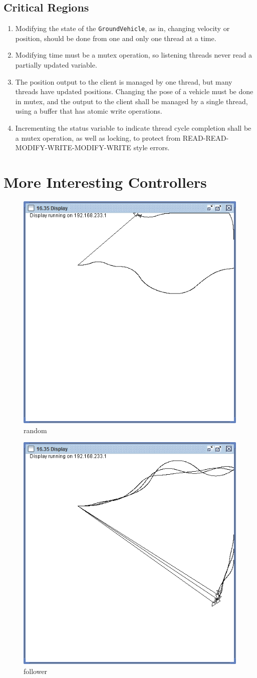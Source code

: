 \documentclass{article}
\begin{document}
\subsection{Critical Regions}
\begin{enumerate}
	\item Modifying the state of the \verb|GroundVehicle|, as in, changing velocity or position, should be done from one and only one thread at a time.
	\item Modifying time must be a mutex operation, so listening threads never read a partially updated variable.
	\item The position output to the client is managed by one thread, but many threads have updated positions.  Changing the pose of a vehicle must be done in mutex, and the output to the client shall be managed by a single thread, using a buffer that has atomic write operations.
	\item Incrementing the status variable to indicate thread cycle completion shall be a mutex operation, as well as locking, to protect from READ-READ-MODIFY-WRITE-MODIFY-WRITE style errors.
\end{enumerate}

\section{More Interesting Controllers}
\begin{figure}
\centering
\includegraphics[width=0.7\linewidth]{random}
\caption{random}
\label{fig:random}
\end{figure}
\begin{figure}
\centering
\includegraphics[width=0.7\linewidth]{follower}
\caption{follower}
\label{fig:follower}
\end{figure}
\end{document}

